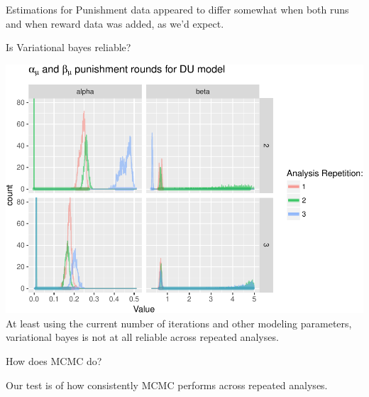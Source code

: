 \documentclass[]{article}
\begin{document}
Estimations for Punishment data appeared to differ somewhat when both
runs and when reward data was added, as we'd expect.

Is Variational bayes reliable?

\includegraphics{compare_vb_and_MCMC_files/figure-latex/VBReliability-1.pdf}
At least using the current number of iterations and other modeling
parameters, variational bayes is not at all reliable across repeated
analyses.

How does MCMC do?

Our test is of how consistently MCMC performs across repeated analyses.
\end{document}
